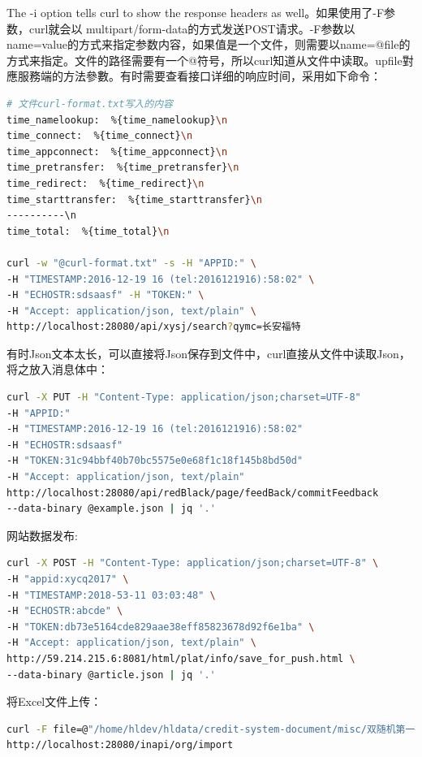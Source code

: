 \documentclass[12pt]{book}
\numberwithin{dummy}{section}
\theoremstyle{ocrenumbox}
\theoremstyle{blacknumex}
\theoremstyle{blacknumbox}
\theoremstyle{ocrenum}
\newlength\esp
\begin{document}
The -i option tells curl to show the response headers as well。如果使用了-F参数，curl就会以 multipart/form-data的方式发送POST请求。-F参数以name=value的方式来指定参数内容，如果值是一个文件，则需要以name=@file的方式来指定。文件的路径需要有一个@符号，所以curl知道从文件中读取。upfile對應服務端的方法參數。有时需要查看接口详细的响应时间，采用如下命令：

\begin{lstlisting}[language=Bash]
# 文件curl-format.txt写入的内容
time_namelookup:  %{time_namelookup}\n
time_connect:  %{time_connect}\n
time_appconnect:  %{time_appconnect}\n
time_pretransfer:  %{time_pretransfer}\n
time_redirect:  %{time_redirect}\n
time_starttransfer:  %{time_starttransfer}\n
----------\n
time_total:  %{time_total}\n

curl -w "@curl-format.txt" -s -H "APPID:" \
-H "TIMESTAMP:2016-12-19 16 (tel:2016121916):58:02" \
-H "ECHOSTR:sdsaasf" -H "TOKEN:" \
-H "Accept: application/json, text/plain" \
http://localhost:28080/api/xysj/search?qymc=长安福特
\end{lstlisting}

有时Json文本太长，可以直接将Json保存到文件中，curl直接从文件中读取Json，将之放入消息体中：

\begin{lstlisting}[language=Bash]
curl -X PUT -H "Content-Type: application/json;charset=UTF-8" 
-H "APPID:"  
-H "TIMESTAMP:2016-12-19 16 (tel:2016121916):58:02"  
-H "ECHOSTR:sdsaasf" 
-H "TOKEN:31c94bbf40b70bc5575e0e68f1c18f145b8bd50d"  
-H "Accept: application/json, text/plain" 
http://localhost:28080/api/redBlack/page/feedBack/commitFeedback 
--data-binary @example.json | jq '.'
\end{lstlisting}

网站数据发布:

\begin{lstlisting}[language=Bash]
curl -X POST -H "Content-Type: application/json;charset=UTF-8" \
-H "appid:xycq2017" \
-H "TIMESTAMP:2018-53-11 03:03:48" \
-H "ECHOSTR:abcde" \
-H "TOKEN:db73e5164cde829aae38eff85823678d92f6e1ba" \
-H "Accept: application/json, text/plain" \
http://59.214.215.6:8081/html/plat/info/save_for_push.html \
--data-binary @article.json | jq '.'
\end{lstlisting}

将Excel文件上传：

\begin{lstlisting}[language=Bash]
curl -F file=@"/home/hldev/hldata/credit-system-document/misc/双随机第一批清单-模板.xls" 
http://localhost:28080/inapi/org/import
\end{lstlisting}
\end{document}
